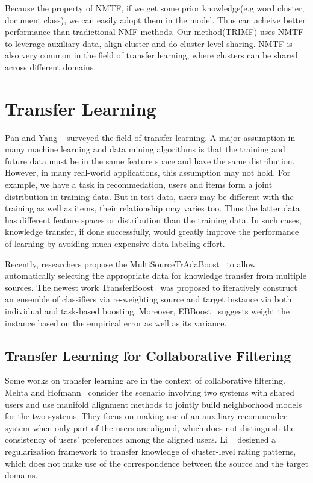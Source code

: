Because the property of NMTF, if we get some prior knowledge(e.g word cluster, document class), we can easily adopt them in the model. Thus can acheive better performance than tradictional NMF methods. Our method(TRIMF) uses NMTF to leverage auxiliary data, align cluster and do cluster-level sharing. NMTF is also very common in the field of transfer learning, where clusters can be shared across different domains.


\hspace{0.1in}
\section{Transfer Learning} Pan and Yang ~\cite{/tkde/sinno09survey} surveyed the field of transfer learning. A major assumption in many machine learning and data mining algorithms is that the training and future data must be in the same feature space and have the same distribution. However, in many real-world applications, this assumption may not hold. For example, we have a task in recommedation, users and items form a joint distribution in training data. But in test data, users may be different with the training as well as items, their relationship may varies too. Thus the latter data has different feature spaces or distribution than the training data. In such cases, knowledge transfer, if done successfully, would greatly improve the performance of learning by avoiding much expensive data-labeling effort.

Recently, researchers propose the MultiSourceTrAdaBoost~\cite{/cvpr/YaoD10} to allow automatically selecting the appropriate data for knowledge transfer from multiple sources. The newest work TransferBoost~\cite{/aaai/Eatond11} was proposed to iteratively construct an ensemble of classifiers via re-weighting source and target instance via both individual and task-based boosting. Moreover, EBBoost~\cite{/jmlr/ShivaswamyJ10a} suggests weight the instance based on the empirical error as well as its variance.

\hspace{0.05in}
\subsection{Transfer Learning for Collaborative Filtering}
Some works on transfer learning are in the context of collaborative filtering.
Mehta and Hofmann~\cite{/ki/bhaskar06cross} consider the scenario involving two systems with shared users and use manifold alignment methods to jointly build neighborhood models for the two systems. They focus on making use of an auxiliary recommender system when only part of the users are aligned, which does not distinguish the consistency of users' preferences among the aligned users.
Li \etal~\cite{/icml/libin09} designed a regularization framework to transfer knowledge of cluster-level rating patterns, which does not make use of the correspondence between the source and the target domains.

